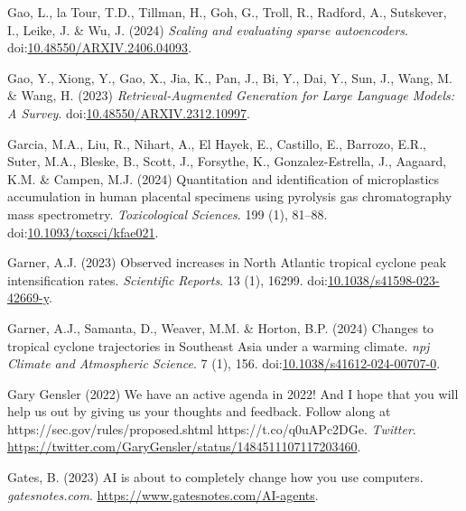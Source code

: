 \documentclass[
  letterpaper,
  DIV=11,
  numbers=noendperiod]{scrartcl}
\newlength{\cslhangindent}
\newenvironment{CSLReferences}[2] %
 {\begin{list}{}{%
  \setlength{\itemindent}{0pt}
  \setlength{\leftmargin}{0pt}
  \setlength{\parsep}{0pt}
  \ifodd #1
   \setlength{\leftmargin}{\cslhangindent}
   \setlength{\itemindent}{-1\cslhangindent}
  \fi
  \setlength{\itemsep}{#2\baselineskip}}}
 {\end{list}}
\begin{document}
\begin{CSLReferences}{0}{1}
Gao, L., la Tour, T.D., Tillman, H., Goh, G., Troll, R., Radford, A.,
Sutskever, I., Leike, J. \& Wu, J. (2024) \emph{Scaling and evaluating
sparse autoencoders}.
doi:\href{https://doi.org/10.48550/ARXIV.2406.04093}{10.48550/ARXIV.2406.04093}.

Gao, Y., Xiong, Y., Gao, X., Jia, K., Pan, J., Bi, Y., Dai, Y., Sun, J.,
Wang, M. \& Wang, H. (2023) \emph{Retrieval-{Augmented Generation} for
{Large Language Models}: {A Survey}}.
doi:\href{https://doi.org/10.48550/ARXIV.2312.10997}{10.48550/ARXIV.2312.10997}.

Garcia, M.A., Liu, R., Nihart, A., El Hayek, E., Castillo, E., Barrozo,
E.R., Suter, M.A., Bleske, B., Scott, J., Forsythe, K.,
Gonzalez-Estrella, J., Aagaard, K.M. \& Campen, M.J. (2024) Quantitation
and identification of microplastics accumulation in human placental
specimens using pyrolysis gas chromatography mass spectrometry.
\emph{Toxicological Sciences}. 199 (1), 81--88.
doi:\href{https://doi.org/10.1093/toxsci/kfae021}{10.1093/toxsci/kfae021}.

Garner, A.J. (2023) Observed increases in {North Atlantic} tropical
cyclone peak intensification rates. \emph{Scientific Reports}. 13 (1),
16299.
doi:\href{https://doi.org/10.1038/s41598-023-42669-y}{10.1038/s41598-023-42669-y}.

Garner, A.J., Samanta, D., Weaver, M.M. \& Horton, B.P. (2024) Changes
to tropical cyclone trajectories in {Southeast Asia} under a warming
climate. \emph{npj Climate and Atmospheric Science}. 7 (1), 156.
doi:\href{https://doi.org/10.1038/s41612-024-00707-0}{10.1038/s41612-024-00707-0}.

Gary Gensler (2022) We have an active agenda in 2022! {And I} hope that
you will help us out by giving us your thoughts and feedback. {Follow}
along at {https://sec.gov/rules/proposed.shtml}
{https://t.co/q0uAPc2DGe}. \emph{Twitter}.
\url{https://twitter.com/GaryGensler/status/1484511107117203460}.

Gates, B. (2023) {AI} is about to completely change how you use
computers. \emph{gatesnotes.com}.
\url{https://www.gatesnotes.com/AI-agents}.


\end{CSLReferences}
\end{document}
